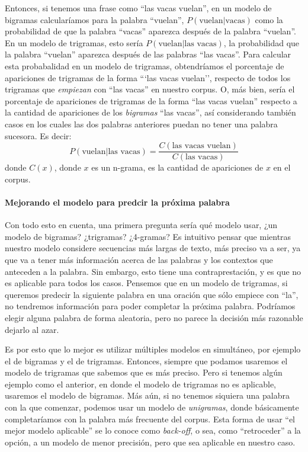 \documentclass[a4paper]{article}
\begin{document}
Entonces, si tenemos una frase como ``las vacas vuelan'', en un modelo de bigramas calcularíamos para la palabra ``vuelan'', $P(\text{vuelan}|\text{vacas})$ como la probabilidad de que la palabra ``vacas'' aparezca después de la palabra ``vuelan''. En un modelo de trigramas, esto sería $P(\text{vuelan}|\text{las vacas})$, la probabilidad que la palabra ``vuelan'' aparezca después de las palabras ``las vacas''. Para calcular esta probabalidad en un modelo de trigramas, obtendríamos el porcentaje de apariciones de trigramas de la forma ```las vacas vuelan'', respecto de todos los trigramas que \textit{empiezan} con ``las vacas'' en nuestro corpus. O, más bien, sería el porcentaje de apariciones de trigramas de la forma ``las vacas vuelan'' respecto a la cantidad de apariciones de los \textit{bigramas} ``las vacas'', así considerando también casos en los cuales las dos palabras anteriores puedan no tener una palabra sucesora. Es decir:
\[
    P(\text{vuelan}|\text{las vacas}) = \frac{C(\text{las vacas vuelan})}{C(\text{las vacas})}
\]
donde $C(x)$, donde $x$ es un n-grama, es la cantidad de apariciones de $x$ en el corpus\cite{TdsGen}.

\paragraph{Mejorando el modelo para predcir la próxima palabra}

Con todo esto en cuenta, una primera pregunta sería qué modelo usar, ¿un modelo de bigramas? ¿trigramas? ¿4-gramas? Es intuitivo pensar que mientras nuestro modelo considere secuencias más largas de texto, más preciso va a ser, ya que va a tener más información acerca de las palabras y los contextos que anteceden a la palabra. Sin embargo, esto tiene una contraprestación, y es que no es aplicable para todos los casos. Pensemos que en un modelo de trigramas, si queremos predecir la siguiente palabra en una oración que sólo empiece con ``la'', no tendremos información para poder completar la próxima palabra. Podríamos elegir alguna palabra de forma aleatoria, pero no parece la decisión más razonable dejarlo al azar.

Es por esto que lo mejor es utilizar múltiples modelos en simultáneo, por ejemplo el de bigramas y el de trigramas. Entonces, siempre que podamos usaremos el modelo de trigramas que sabemos que es más preciso. Pero si tenemos algún ejemplo como el anterior, en donde el modelo de trigramas no es aplicable, usaremos el modelo de bigramas. Más aún, si no tenemos siquiera una palabra con la que comenzar, podemos usar un modelo de \textit{unigramas}, donde básicamente completaríamos con la palabra más frecuente del corpus. Esta forma de usar ``el mejor modelo aplicable'' se lo conoce como \textit{back-off}, o sea, como ``retroceder'' a la opción, a un modelo de menor precisión, pero que sea aplicable en nuestro caso.
\end{document}
